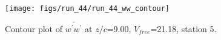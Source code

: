 \begin{figure}[H]
\centering
\texttt{[image: figs/run\_44/run\_44\_ww\_contour]}
\caption{Contour plot of $\overline{w^\prime w^\prime}$ at $z/c$=9.00, $V_{free}$=21.18, station 5.}
\label{fig:run_44_ww_contour}
\end{figure}


